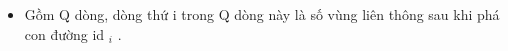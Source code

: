 \begin{itemize}
	\item     Gồm Q dòng, dòng thứ i trong Q dòng này là số vùng liên thông sau khi phá con đường id    $_     i    $    .   
\end{itemize}